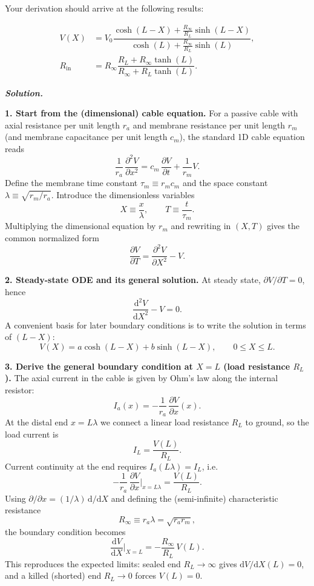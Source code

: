 \documentclass{article}
\newif\ifsolutionclearpage
\newenvironment{solution}{%
    \ifsolutionclearpage\clearpage\fi
    \global\solutionclearpagetrue
    \par\noindent\begin{solutionbox}\textbf{\textit{Solution.}}\par\medskip\itshape
}{%
    \end{solutionbox}
}
\begin{document}
Your derivation should arrive at the following results:

\begin{align*}
    V(X)&=V_0\dfrac{\cosh(L-X)+\frac{R_{\infty}}{R_L}\sinh(L-X)}
    {\cosh(L)+\frac{R_{\infty}}{R_L}\sinh(L)},\\[6pt]
    R_{\mathrm{in}}&=R_{\infty}\dfrac{R_L+R_{\infty}\tanh(L)}
    {R_{\infty}+R_L\tanh(L)}.
\end{align*}

\begin{solution}
\textbf{1. Start from the (dimensional) cable equation.}
For a passive cable with axial resistance per unit length $r_a$ and membrane resistance per unit length $r_m$ (and membrane capacitance per unit length $c_m$), the standard 1D cable equation reads
\[
\frac{1}{r_a}\,\frac{\partial^2 V}{\partial x^2}
= c_m\,\frac{\partial V}{\partial t}+\frac{1}{r_m}V.
\]
Define the membrane time constant $\tau_m\equiv r_m c_m$ and the space constant $\lambda\equiv\sqrt{r_m/r_a}$.
Introduce the dimensionless variables
\[
X\equiv\frac{x}{\lambda},\qquad T\equiv\frac{t}{\tau_m}.
\]
Multiplying the dimensional equation by $r_m$ and rewriting in $(X,T)$ gives the common normalized form
\[
\frac{\partial V}{\partial T}=\frac{\partial^2 V}{\partial X^2}-V.
\]

\medskip
\textbf{2. Steady-state ODE and its general solution.}
At steady state, $\partial V/\partial T=0$, hence
\[
\frac{\mathrm{d}^2 V}{\mathrm{d}X^2}-V=0.
\]
A convenient basis for later boundary conditions is to write the solution in terms of $(L-X)$:
\[
V(X)=a\cosh(L-X)+b\sinh(L-X),\qquad 0\le X\le L.
\]

\medskip
\textbf{3. Derive the general boundary condition at $X=L$ (load resistance $R_L$).}
The axial current in the cable is given by Ohm's law along the internal resistor:
\[
I_a(x)=-\frac{1}{r_a}\,\frac{\partial V}{\partial x}(x).
\]
At the distal end $x=L\lambda$ we connect a linear load resistance $R_L$ to ground, so the load current is
\[
I_L=\frac{V(L)}{R_L}.
\]
Current continuity at the end requires $I_a(L\lambda)=I_L$, i.e.
\[
-\frac{1}{r_a}\,\frac{\partial V}{\partial x}\bigg|_{x=L\lambda}=\frac{V(L)}{R_L}.
\]
Using $\partial/\partial x=(1/\lambda)\,\mathrm{d}/\mathrm{d}X$ and defining the (semi-infinite) characteristic resistance
\[
R_{\infty}\equiv r_a\lambda=\sqrt{r_a r_m},
\]
the boundary condition becomes
\[
\frac{\mathrm{d}V}{\mathrm{d}X}\bigg|_{X=L}=-\frac{R_{\infty}}{R_L}\,V(L).
\]
This reproduces the expected limits: sealed end $R_L\to\infty$ gives $\mathrm{d}V/\mathrm{d}X(L)=0$, and a killed (shorted) end $R_L\to 0$ forces $V(L)=0$.


\end{solution}
\end{document}
